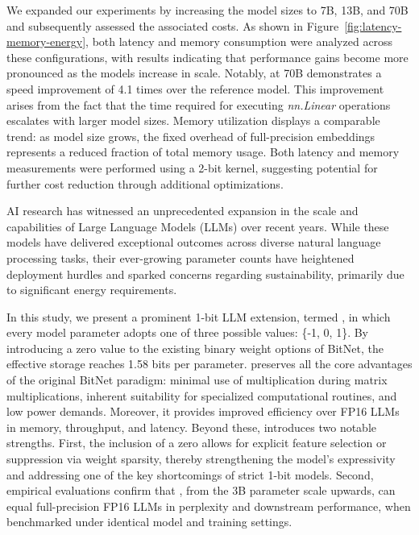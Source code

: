 We expanded our experiments by increasing the model sizes to 7B, 13B, and 70B and subsequently assessed the associated costs. As shown in Figure~\ref{fig:latency-memory-energy}, both latency and memory consumption were analyzed across these configurations, with results indicating that performance gains become more pronounced as the models increase in scale. Notably,  at 70B demonstrates a speed improvement of 4.1 times over the  reference model. This improvement arises from the fact that the time required for executing \emph{nn.Linear} operations escalates with larger model sizes. Memory utilization displays a comparable trend: as model size grows, the fixed overhead of full-precision embeddings represents a reduced fraction of total memory usage. Both latency and memory measurements were performed using a 2-bit kernel, suggesting potential for further cost reduction through additional optimizations.

AI research has witnessed an unprecedented expansion in the scale and capabilities of Large Language Models (LLMs) over recent years. While these models have delivered exceptional outcomes across diverse natural language processing tasks, their ever-growing parameter counts have heightened deployment hurdles and sparked concerns regarding sustainability, primarily due to significant energy requirements.

In this study, we present a prominent 1-bit LLM extension, termed \textbf{}, in which every model parameter adopts one of three possible values: \{-1, 0, 1\}. By introducing a zero value to the existing binary weight options of BitNet, the effective storage reaches 1.58 bits per parameter.  preserves all the core advantages of the original BitNet paradigm: minimal use of multiplication during matrix multiplications, inherent suitability for specialized computational routines, and low power demands. Moreover, it provides improved efficiency over FP16 LLMs in memory, throughput, and latency. Beyond these,  introduces two notable strengths. First, the inclusion of a zero allows for explicit feature selection or suppression via weight sparsity, thereby strengthening the model’s expressivity and addressing one of the key shortcomings of strict 1-bit models. Second, empirical evaluations confirm that , from the 3B parameter scale upwards, can equal full-precision FP16 LLMs in perplexity and downstream performance, when benchmarked under identical model and training settings.

